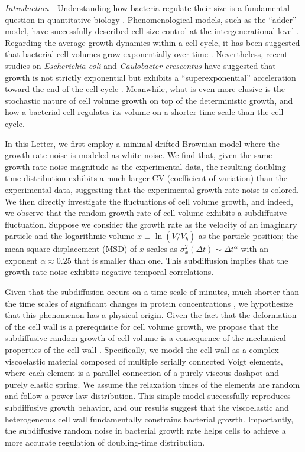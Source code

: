 \documentclass[aps, prl, twocolumn, longbibliography, linenumbers, superscriptaddress]{revtex4-2}
\begin{document}
{\it Introduction---}Understanding how bacteria regulate their size is a fundamental question in quantitative biology \cite{Ho2018modeling, Cadart2019physics}. Phenomenological models, such as the ``adder'' model, have successfully described cell size control at the intergenerational level \cite{Amir2014cell, Campos2014constant, Taheri2015cell}. Regarding the average growth dynamics within a cell cycle, it has been suggested that bacterial cell volumes grow exponentially over time \cite{Wang2010robust, Godin2010using, Campos2014constant, Taheri2015cell}. Nevertheless, recent studies on {\it Escherichia coli} and {\it Caulobacter crescentus} have suggested that growth is not strictly exponential but exhibits a ``superexponential'' acceleration toward the end of the cell cycle \cite{Kar2021distinguishing, Cylke2023super, Cylke2025gene}. Meanwhile, what is even more elusive is the stochastic nature of cell volume growth on top of the deterministic growth, and how a bacterial cell regulates its volume on a shorter time scale than the cell cycle.

In this Letter, we first employ a minimal drifted Brownian model where the growth-rate noise is modeled as white noise. We find that, given the same growth-rate noise magnitude as the experimental data, the resulting doubling-time distribution exhibits a much larger CV (coefficient of variation) than the experimental data, suggesting that the experimental growth-rate noise is colored. We then directly investigate the fluctuations of cell volume growth, and indeed, we observe that the random growth rate of cell volume exhibits a subdiffusive fluctuation. Suppose we consider the growth rate as the velocity of an imaginary particle and the logarithmic volume $x \equiv \ln(V/\bar{V}_b)$ as the particle position; the mean square displacement (MSD) of $x$ scales as $\sigma^2_x (\Delta t) \sim \Delta t^{\alpha}$ with an exponent $\alpha \approx 0.25$ that is smaller than one. This subdiffusion implies that the growth rate noise exhibits negative temporal correlations.

Given that the subdiffusion occurs on a time scale of minutes, much shorter than the time scales of significant changes in protein concentrations \cite{Kiviet2014stochasticity, Milo2015cell}, we hypothesize that this phenomenon has a physical origin. Given the fact that the deformation of the cell wall is a prerequisite for cell volume growth, we propose that the subdiffusive random growth of cell volume is a consequence of the mechanical properties of the cell wall \cite{Seltmann2002bacterial, Meroueh2006three, Rodriguez2008surface, Auer2017bacterial, Weber2022power}. Specifically, we model the cell wall as a complex viscoelastic material composed of multiple serially connected Voigt elements, where each element is a parallel connection of a purely viscous dashpot and purely elastic spring. We assume the relaxation times of the elements are random and follow a power-law distribution. This simple model successfully reproduces subdiffusive growth behavior, and our results suggest that the viscoelastic and heterogeneous cell wall fundamentally constrains bacterial growth. Importantly, the subdiffusive random noise in bacterial growth rate helps cells to achieve a more accurate regulation of doubling-time distribution.
\end{document}
